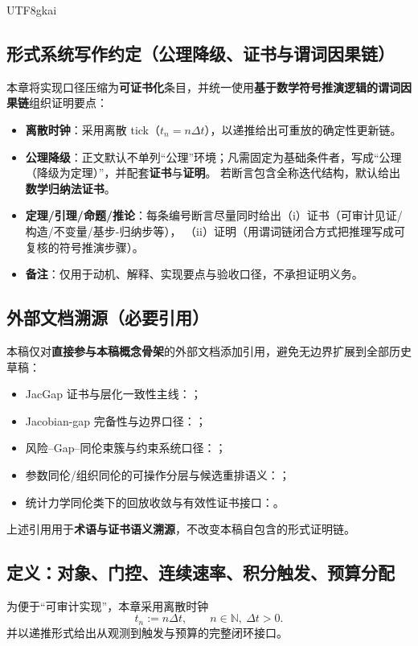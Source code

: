 \documentclass[12pt]{article}
\newcommand{\NN}{\mathbb{N}}
\begin{document}
\begin{CJK*}{UTF8}{gkai}
\subsection{形式系统写作约定（公理降级、证书与谓词因果链）}
\label{subsec:tex28-writing-convention}
本章将实现口径压缩为\textbf{可证书化}条目，并统一使用\textbf{基于数学符号推演逻辑的谓词因果链}组织证明要点：
\begin{itemize}
  \item \textbf{离散时钟}：采用离散 tick（$t_n=n\Delta t$），以递推给出可重放的确定性更新链。
  \item \textbf{公理降级}：正文默认不单列“公理”环境；凡需固定为基础条件者，写成“公理（降级为定理）”，并配套\textbf{证书}与\textbf{证明}。
  若断言包含全称迭代结构，默认给出\textbf{数学归纳法证书}。
  \item \textbf{定理/引理/命题/推论}：每条编号断言尽量同时给出（i）证书（可审计见证/构造/不变量/基步-归纳步等），
  （ii）证明（用谓词链闭合方式把推理写成可复核的符号推演步骤）。
  \item \textbf{备注}：仅用于动机、解释、实现要点与验收口径，不承担证明义务。
\end{itemize}

\subsection{外部文档溯源（必要引用）}
\label{subsec:tex28-external-provenance}
本稿仅对\textbf{直接参与本稿概念骨架}的外部文档添加引用，避免无边界扩展到全部历史草稿：
\begin{itemize}
  \item JacGap 证书与层化一致性主线：\cite{GaoZhengAppVol1,GaoZhengAppVol3}；
  \item Jacobian-gap 完备性与边界口径：\cite{GaoZhengAppVol2}；
  \item 风险--Gap--同伦束簇与约束系统口径：\cite{appmath-vol4-pub}；
  \item 参数同伦/组织同伦的可操作分层与候选重排语义：\cite{notebook-tex23}；
  \item 统计力学同伦类下的回放收敛与有效性证书接口：\cite{notebook-tex27}。
\end{itemize}
上述引用用于\textbf{术语与证书语义溯源}，不改变本稿自包含的形式证明链。

\subsection{定义：对象、门控、连续速率、积分触发、预算分配}
\label{subsec:tex28-defs}
为便于“可审计实现”，本章采用离散时钟
\[
  t_n := n\Delta t,\qquad n\in\NN,\ \Delta t>0.
\]
并以递推形式给出从观测到触发与预算的完整闭环接口。


\end{CJK*}
\end{document}
